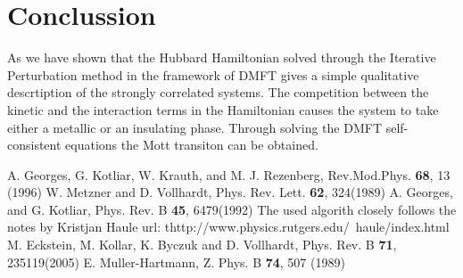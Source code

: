 \documentclass[aps,prl,twocolumn,showpacs,floatfix,superscriptaddress]{revtex4-1}
\begin{document}
\section{\label{sec:conclusion}Conclussion}
As we have shown that the Hubbard Hamiltonian solved through the Iterative Perturbation method in the framework of DMFT gives a simple qualitative descrtiption of the strongly correlated systems. The competition between the kinetic and the interaction terms in the Hamiltonian causes the system to take either a metallic or an insulating phase. Through solving the DMFT self-consistent equations the Mott transiton can be obtained.
\begin{thebibliography}{1}
         A. Georges, G. Kotliar, W. Krauth, and M. J. Rezenberg, Rev.Mod.Phys. \textbf{68}, 13 (1996)
	 W. Metzner and D. Vollhardt, Phys. Rev. Lett. \textbf{62}, 324(1989)
	 A. Georges, and G. Kotliar, Phys. Rev. B \textbf{45}, 6479(1992)
	 The used algorith closely follows the notes by Kristjan Haule url: thttp://www.physics.rutgers.edu/~haule/index.html
	 M. Eckstein, M. Kollar, K. Byczuk and D. Vollhardt, Phys. Rev. B \textbf{71}, 235119(2005)
	 E. Muller-Hartmann, Z. Phys. B \textbf{74}, 507 (1989)
\end{thebibliography}
\end{document}
